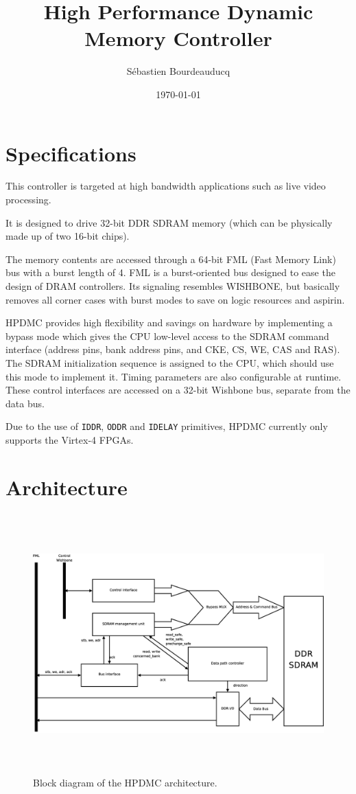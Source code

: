 \documentclass[a4paper,11pt]{article}
\title{High Performance Dynamic Memory Controller}
\author{S\'ebastien Bourdeauducq}
\date{\today}
\begin{document}
\maketitle{}
\section{Specifications}
This controller is targeted at high bandwidth applications such as live video processing.

It is designed to drive 32-bit DDR SDRAM memory (which can be physically made up of two 16-bit chips).

The memory contents are accessed through a 64-bit FML (Fast Memory Link) bus with a burst length of 4. FML is a burst-oriented bus designed to ease the design of DRAM controllers. Its signaling resembles WISHBONE, but basically removes all corner cases with burst modes to save on logic resources and aspirin.

HPDMC provides high flexibility and savings on hardware by implementing a bypass mode which gives the CPU low-level access to the SDRAM command interface (address pins, bank address pins, and CKE, CS, WE, CAS and RAS). The SDRAM initialization sequence is assigned to the CPU, which should use this mode to implement it. Timing parameters are also configurable at runtime. These control interfaces are accessed on a 32-bit Wishbone bus, separate from the data bus.

Due to the use of \verb!IDDR!, \verb!ODDR! and \verb!IDELAY! primitives, HPDMC currently only supports the Virtex-4 FPGAs.

\section{Architecture}

\begin{figure}[htp]
\centering
\includegraphics[height=100mm]{blockdiagram.eps}
\caption{Block diagram of the HPDMC architecture.}\label{fig:blockdiagram}
\end{figure}
\end{document}
